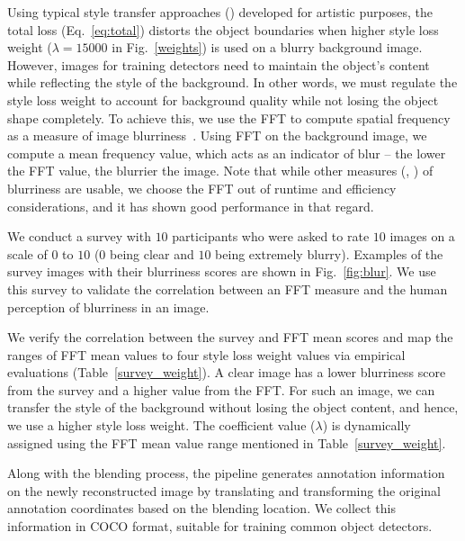 Using typical style transfer approaches (\eg\cite{zhang_deep_2020,wu_gp-gan_2019}) developed for artistic purposes, the total loss (Eq.~\ref{eq:total}) distorts the object boundaries when higher style loss weight (\eg $\lambda=15000$ in Fig.~\ref{weights}) is used on a blurry background image.
However, images for training detectors need to maintain the object's content while reflecting the style of the background. 
In other words, we must regulate the style loss weight to account for background quality while not losing the object shape completely. To achieve this, we use the FFT to compute spatial frequency as a measure of image blurriness~\cite{liu_image_2008}. Using FFT on the background image, we compute a mean frequency value, which acts as an indicator of blur -- the lower the FFT value, the blurrier the image.
Note that while other measures (\cite{laplacian_blur}, \cite{wavlet_blur}) of blurriness are usable, we choose the FFT out of runtime and efficiency considerations, and it has shown good performance in that regard.




We conduct a survey with $10$ participants who were asked to rate $10$ images on a scale of $0$ to $10$ ($0$ being clear and $10$ being extremely blurry). Examples of the survey images with their blurriness scores are shown in Fig.~\ref{fig:blur}. We use this survey to validate the correlation between an FFT measure and the human perception of blurriness in an image. 



We verify the correlation between the survey and FFT mean scores and map the ranges of FFT mean values to four style loss weight values via empirical evaluations (Table~\ref{survey_weight}). A clear image has a lower blurriness score from the survey and a higher value from the FFT. For such an image, we can transfer the style of the background without losing the object content, and hence, we use a higher style loss weight. The coefficient value ($\lambda$) is dynamically assigned using the FFT mean value range mentioned in Table~\ref{survey_weight}.
 



Along with the blending process, the pipeline generates annotation information on the newly reconstructed image by translating and transforming the original annotation coordinates based on the blending location. We collect this information in COCO format, suitable for training common object detectors. 

